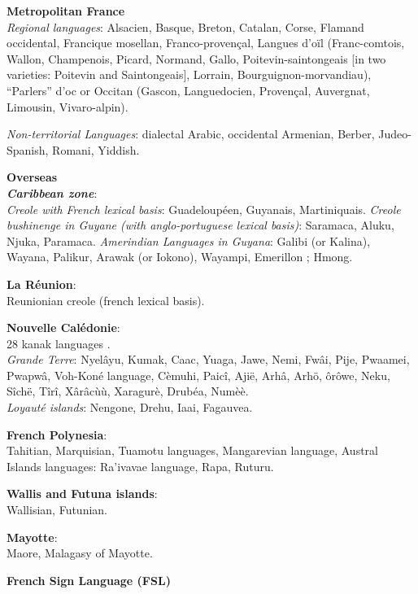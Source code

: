 \begin{multicols}{2}
{\bf Metropolitan France}\\
{\em Regional languages}: Alsacien, Basque, Breton, Catalan, Corse, Flamand occidental, Francique mosellan, Franco-provençal, Langues d'oïl (Franc-comtois, Wallon, Champenois, Picard, Normand, Gallo, Poitevin-saintongeais [in two varieties: Poitevin and Saintongeais], Lorrain, Bourguignon-morvandiau), ``Parlers'' d'oc or Occitan (Gascon, Languedocien, Provençal, Auvergnat, Limousin, Vivaro-alpin).

{\em Non-territorial Languages}: dialectal Arabic, occidental Armenian, Berber, Judeo-Spanish, Romani, Yiddish.

{\bf Overseas}\\
\textbf{ \emph{Caribbean zone}}:\\
{\em Creole with French lexical basis}: Guadeloupéen, Guyanais, Martiniquais.
{\em Creole bushinenge in Guyane (with anglo-portuguese lexical basis)}: Saramaca, Aluku, Njuka, Paramaca.
{\em Amerindian Languages in Guyana}: Galibi (or Kalina), Wayana, Palikur, Arawak (or Iokono), Wayampi, Emerillon ; Hmong.

{\bf La Réunion}:\\
Reunionian creole  (french lexical basis).

{\bf Nouvelle Calédonie}:\\
28 kanak languages .\\
{\em Grande Terre}: Nyelâyu, Kumak, Caac, Yuaga, Jawe, Nemi, Fwâi, Pije, Pwaamei, Pwapwâ, Voh-Koné language, Cèmuhi, Paicî, Ajië, Arhâ, Arhö, ôrôwe, Neku, Sîchë, Tîrî, Xârâcùù, Xaragurè, Drubéa, Numèè. \\
{\em Loyauté islands}: Nengone, Drehu, Iaai, Fagauvea.

{\bf French Polynesia}:\\
Tahitian, Marquisian, Tuamotu languages, Mangarevian language, Austral Islands languages: Ra'ivavae language, Rapa, Ruturu.

{\bf Wallis and Futuna islands}:\\
Wallisian, Futunian.

{\bf Mayotte}:\\
Maore, Malagasy of Mayotte.

{\bf French Sign Language (FSL)}\\

\end{multicols}

\clearpage



